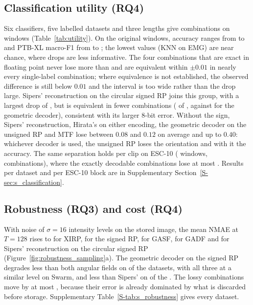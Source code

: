 \documentclass[preprint,review,12pt]{elsarticle}
\begin{document}
\subsection{Classification utility (RQ4)}
Six classifiers, five labelled datasets and three lengths give \clsCombos{} combinations on \clsWindows{} windows (Table~\ref{tab:utility}). On the original windows, accuracy ranges from \origAccMin{} to \origAccMax{} and PTB-XL macro-F1 from \origFoneMin{} to \origFoneMax{}; the lowest values (KNN on EMG) are near chance, where drops are less informative. The four combinations that are exact in floating point never lose more than \clsMaxDropExact{} and are equivalent within $\pm0.01$ in nearly every single-label combination; where equivalence is not established, the observed difference is still below $0.01$ and the interval is too wide rather than the drop large. Sipers' reconstruction on the circular signed RP joins this group, with a largest drop of \sipersSigMaxDrop{}, but is equivalent in fewer combinations (\sipersSigEq{} of \clsCombosEq{}, against \clsEqRP{} for the geometric decoder), consistent with its larger 8-bit error. Without the sign, Sipers' reconstruction, Hirata's on either encoding, the geometric decoder on the unsigned RP and MTF lose between $0.08$ and $0.12$ on average and up to $0.40$: whichever decoder is used, the unsigned RP loses the orientation and with it the accuracy. The same separation holds per clip on ESC-10 (\escWindows{} windows, \escCombos{} combinations), where the exactly decodable combinations lose at most \escMaxDropExact{}. Results per dataset and per ESC-10 block are in Supplementary Section~\ref{S-sec:s_classification}.

\begin{table}[H]
\centering
\caption{Drop from the original accuracy (macro-F1 on PTB-XL) for classifiers trained on original windows and tested on reconstructions. $|\Delta|\le0.01$: share of combinations whose observed drop is within $0.01$. Equivalent: $95\%$ group-bootstrap interval within $\pm0.01$, over the single-label combinations.}\label{tab:utility}
\footnotesize
\setlength{\tabcolsep}{3pt}

\end{table}

\subsection{Robustness (RQ3) and cost (RQ4)}
With noise of $\sigma=16$ intensity levels on the stored image, the mean NMAE at $T=128$ rises to \robHighXIRP{} for XIRP, \robHighRP{} for the signed RP, \robHighGASF{} for GASF, \robHighGADF{} for GADF and \robHighSIPERS{} for Sipers' reconstruction on the circular signed RP (Figure~\ref{fig:robustness_sampling}a). The geometric decoder on the signed RP degrades less than both angular fields on \robDatasetsRPBetter{} of the \robDatasets{} datasets, with all three at a similar level on Swarm, and less than Sipers' on \robDatasetsRPBetterSipers{} of the \robDatasets{}. The lossy combinations move by at most \robLossyShift{}, because their error is already dominated by what is discarded before storage. Supplementary Table~\ref{S-tab:s_robustness} gives every dataset.
\end{document}
